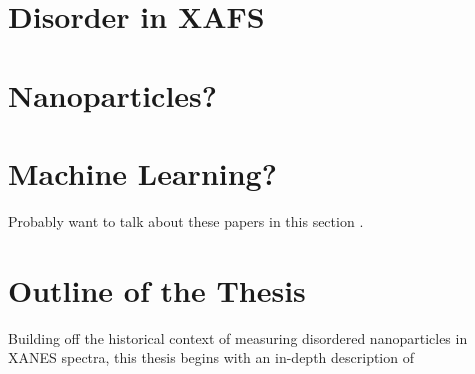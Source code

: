 \section{Disorder in XAFS}

\section{Nanoparticles?}
\section{Machine Learning?}

Probably want to talk about these papers in this section \cite{timoshenko2018neural} \cite{Timoshenko2017}.
\section{Outline of the Thesis}
Building off the historical context of measuring disordered nanoparticles in XANES spectra, this thesis begins with an in-depth description of 
